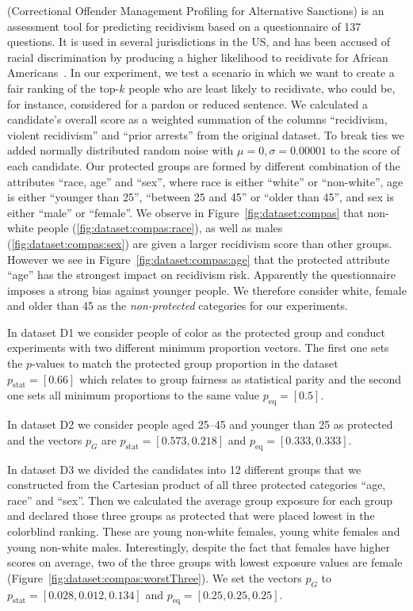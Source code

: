  (Correctional Offender Management Profiling for Alternative Sanctions) is an assessment tool for predicting recidivism based on a questionnaire of 137 questions. It is used in several jurisdictions in the US, and has been accused of racial discrimination by producing a higher likelihood to recidivate for African Americans~\cite{angwin_2016_machine}.
%
In our experiment, we test a scenario in which we want to create a fair ranking of the top-$k$ people who are least likely to recidivate, who could be, for instance, considered for a pardon or reduced sentence.
%
We calculated a candidate's overall score as a weighted summation of the columns ``recidivism, violent recidivism'' and ``prior arrests'' from the original dataset.
%
To break ties we added normally distributed random noise with $\mu=0, \sigma=0.00001$ to the score of each candidate.
%
Our protected groups are formed by different combination of the attributes ``race, age'' and ``sex'', where race is either ``white'' or ``non-white'', age is either ``younger than 25'', ``between 25 and 45'' or ``older than 45'', and sex is either ``male'' or ``female''.
%
We observe in Figure~\ref{fig:dataset:compas} that non-white people (\ref{fig:dataset:compas:race}), as well as males (\ref{fig:dataset:compas:sex}) are given a larger recidivism score than other groups.
%
However we see in Figure~\ref{fig:dataset:compas:age} that the protected attribute ``age'' has the strongest impact on recidivism risk. 
%
Apparently the questionnaire imposes a strong bias against younger people.
%
We therefore consider white, female and older than 45 as the \emph{non-protected} categories for our experiments.

In dataset D1 we consider people of color as the protected group and conduct experiments with two different minimum proportion vectors.
%
The first one sets the $p$-values to match the protected group proportion in the dataset $p_{\text{stat}}=[0.66]$ which relates to group fairness as statistical parity and the second one sets all minimum proportions to the same value $p_{\text{eq}}=[0.5]$.

In dataset D2 we consider people aged 25--45 and younger than 25 as protected and the vectors $p_G$ are $p_{\text{stat}}=[0.573,0.218]$ and $p_{\text{eq}}=[0.333, 0.333]$. 

In dataset D3 we divided the candidates into 12 different groups that we constructed from the Cartesian product of all three protected categories ``age, race'' and ``sex''. 
%
Then we calculated the average group exposure for each group and declared those three groups as protected that were placed lowest in the colorblind ranking.
%
These are young non-white females, young white females and young non-white males.
%
Interestingly, despite the fact that females have higher scores on average, two of the three groups with lowest exposure values are female (Figure~\ref{fig:dataset:compas:worstThree}).
%
We set the vectors $p_G$ to $p_{\text{stat}}=[0.028,0.012,0.134]$ and $p_{\text{eq}}=[0.25,0.25,0.25]$. 

